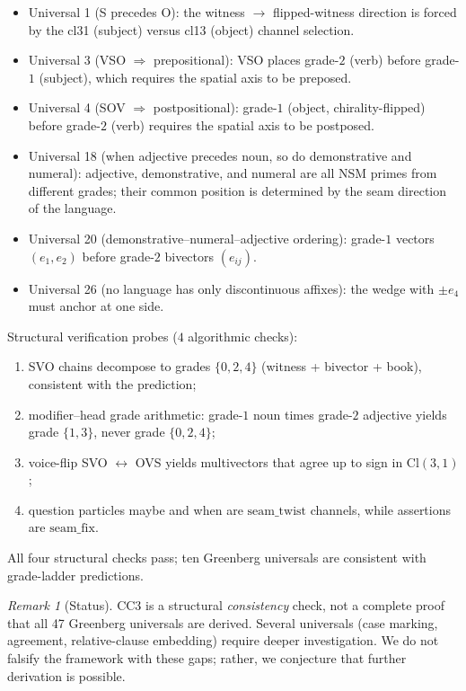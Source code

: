 \documentclass[11pt,a4paper]{article}
\theoremstyle{plain}
\theoremstyle{definition}
\theoremstyle{remark}
\newtheorem{remark}[theorem]{Remark}
\numberwithin{equation}{section}
\providecommand{\Cl}{\mathrm{Cl}}
\providecommand{\seamfix}{\mathrm{seam\_fix}}
\providecommand{\seamtwist}{\mathrm{seam\_twist}}
\begin{document}
\begin{itemize}
\item Universal 1 (S precedes O): the witness $\to$ flipped-witness
      direction is forced by the cl31 (subject) versus cl13
      (object) channel selection.
\item Universal 3 (VSO $\Rightarrow$ prepositional): VSO places
      grade-$2$ (verb) before grade-$1$ (subject), which requires
      the spatial axis to be preposed.
\item Universal 4 (SOV $\Rightarrow$ postpositional): grade-$1$
      (object, chirality-flipped) before grade-$2$ (verb) requires
      the spatial axis to be postposed.
\item Universal 18 (when adjective precedes noun, so do
      demonstrative and numeral): adjective, demonstrative, and
      numeral are all NSM primes from different grades; their
      common position is determined by the seam direction of the
      language.
\item Universal 20 (demonstrative--numeral--adjective ordering):
      grade-$1$ vectors $(e_1, e_2)$ before grade-$2$ bivectors
      $(e_{ij})$.
\item Universal 26 (no language has only discontinuous affixes):
      the wedge with $\pm e_4$ must anchor at one side.
\end{itemize}

Structural verification probes ($4$ algorithmic checks):
\begin{enumerate}[label=(\alph*)]
\item SVO chains decompose to grades $\{0, 2, 4\}$ (witness +
      bivector + book), consistent with the prediction;
\item modifier--head grade arithmetic: grade-$1$ noun times
      grade-$2$ adjective yields grade $\{1, 3\}$, never grade
      $\{0, 2, 4\}$;
\item voice-flip SVO $\leftrightarrow$ OVS yields multivectors
      that agree up to sign in $\Cl(3,1)$;
\item question particles \textsf{maybe} and \textsf{when} are
      $\seamtwist$ channels, while assertions are $\seamfix$.
\end{enumerate}

All four structural checks pass; ten Greenberg universals are
consistent with grade-ladder predictions.

\begin{remark}[Status]
CC3 is a structural \emph{consistency} check, not a complete proof
that all 47 Greenberg universals are derived.  Several universals
(case marking, agreement, relative-clause embedding) require deeper
investigation.  We do not falsify the framework with these gaps;
rather, we conjecture that further derivation is possible.
\end{remark}
\end{document}
